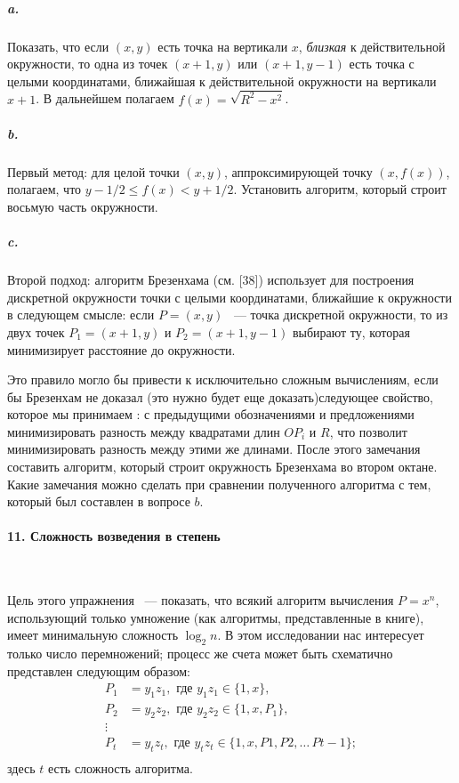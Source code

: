 \subparagraph { a.} Показать, что если $\left({x,y}\right)$ есть точка на вертикали $x$, \textit{близкая} к действительной окружности, то одна из точек $\left({x+1,y}\right)$ или  $\left({x+1,y-1}\right)$ есть точка с целыми координатами, ближайшая к действительной окружности на вертикали $x+1$. В дальнейшем полагаем $f\left({x}\right)=\sqrt{R^{2}-x^{2}}$.
\newpage
	

\subparagraph { b.} Первый метод: для целой точки $\left({x,y}\right)$, аппроксимирующей точку $\left(x,f(x)\right)$, полагаем, что $y-1/2\leqslant{f\left({x}\right)}<y+1/2$. Установить алгоритм, который строит восьмую часть окружности. 

\subparagraph { c.} Второй подход: алгоритм Брезенхама (см. [38]) использует для построения дискретной окружности точки с целыми координатами, ближайшие к окружности в следующем смысле:  если $P=\left({x,y}\right)$ ~--- точка дискретной окружности, то из двух точек  $P_{1}=\left({x+1,y}\right)$ и  $P_{2}=\left({x+1,y-1}\right)$ выбирают ту, которая минимизирует расстояние до окружности. 

Это правило могло бы привести к исключительно сложным вычислениям, если бы Брезенхам не доказал (это нужно будет еще доказать)следующее свойство, которое мы принимаем : с предыдущими обозначениями и предложениями минимизировать разность между квадратами длин $OP_{i}$ и $R$, что позволит минимизировать разность между этими же длинами. После этого замечания составить алгоритм, который строит окружность Брезенхама во втором октане. Какие замечания можно сделать при сравнении полученного алгоритма с тем, который был составлен в вопросе $b$.

\paragraph { 11. Сложность возведения в степень}\ \newline

Цель этого упражнения ~--- показать, что всякий алгоритм вычисления $P=x^{n}$, использующий только умножение (как алгоритмы, представленные в книге), имеет минимальную сложность $\log_{2}{n}$. В этом исследовании нас интересует только число перемножений; процесс же счета может быть схематично представлен следующим образом:
\begin{equation*}
\begin{split}
P_{1}&=y_{1}z_{1}, \text{ где } y_{1}z_{1} \in{\{1,x\}},\\ 
P_{2}&=y_{2}z_{2}, \text{ где } y_{2}z_{2} \in{\{1,x,P_{1}\}},\\
\vdots\\
P_{t}&=y_{t}z_{t}, \text{ где } y_{t}z_{t} \in{\{1,x,P{1},P{2}, \dots\,P{t-1}\}};\\
\end{split}
\end{equation*}
здесь $t$ есть сложность алгоритма. 

